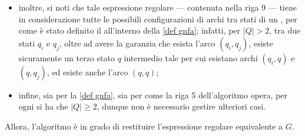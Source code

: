 \documentclass[a4paper, 12pt]{report}
\begin{document}
{\begin{itemize}
\begin{figure}[H]
                \end{figure}

                poiché l'arco che $q$ ha su sé stesso è stato descritto attraverso $(R_2)^*$, gli archi $(q_i, q)$ e $(q, q_j)$ sono stati inseriti per concatenazione, ed infine è stato unito l'altro possibile cammino verso $q_j$ tramite unione;

            \item inoltre, si noti che tale espressione regolare --- contenuta nella riga 9 --- tiene in considerazione tutte le possibili configurazioni di archi tra stati di un \GNFA, per come è stato definito il \GNFA all'interno della \cref{def gnfa}; infatti, per $|Q| > 2$, tra due stati $q_i$ e $q_j$, oltre ad avere la garanzia che esista l'arco $(q_i, q_j)$, esiste sicuramente un terzo stato $q$ intermedio tale per cui esistano archi $(q_i, q)$ e $(q, q_j)$, ed esiste anche l'arco $(q,q)$;

            \item infine, sia per la \cref{def gnfa}, sia per come la riga 5 dell'algoritmo opera, per ogni \GNFA si ha che $|Q| \ge 2$, dunque non è necessario gestire ulteriori casi.
        \end{itemize}

        Allora, l'algoritmo è in grado di restituire l'espressione regolare equivalente a $G$.
    }
\end{document}
